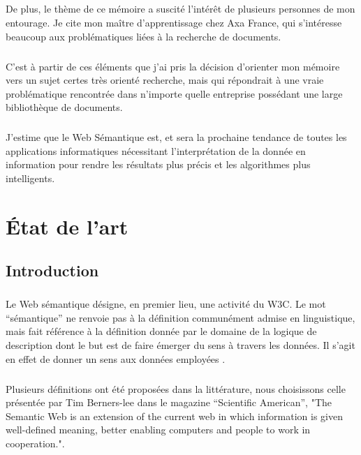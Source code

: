 \documentclass[12pt, a4paper, oneside]{book}
\begin{document}
\paragraph{}
De plus, le thème de ce mémoire a suscité l'intérêt de plusieurs personnes de mon entourage. Je cite mon maître d'apprentissage chez Axa France, qui s'intéresse beaucoup aux problématiques liées à la recherche de documents.
\paragraph{}
C'est à partir de ces éléments que j'ai pris la décision d'orienter mon mémoire vers un sujet certes très orienté recherche, mais qui répondrait à une vraie problématique rencontrée dans n'importe quelle entreprise possédant une large bibliothèque de documents.
\paragraph{}
J'estime que le Web Sémantique est, et sera la prochaine tendance de toutes les applications informatiques nécessitant l'interprétation de la donnée en information pour rendre les résultats plus précis et les algorithmes plus intelligents.


\chapter{État de l'art}
\section{Introduction}

\paragraph{}
Le Web sémantique désigne, en premier lieu, une activité du W3C.
Le mot “sémantique” ne renvoie pas à la définition communément admise en linguistique, mais fait référence à la définition donnée par le domaine de la logique de description dont le but est de faire émerger du sens à travers les données. Il s'agit en effet de donner un sens aux données employées \citep{w3c}.
\paragraph{}
Plusieurs définitions ont été proposées dans la littérature, nous choisissons celle présentée par Tim Berners-lee dans le magazine “Scientific American”, "The Semantic Web is an extension of the current web in which information is given well-defined meaning, better enabling computers and people to work in cooperation.". \citep{defOnto}
\end{document}
